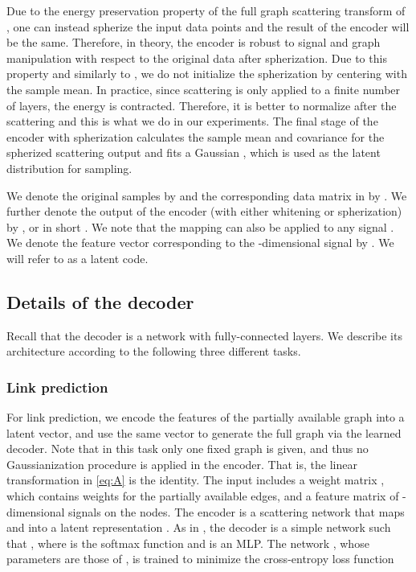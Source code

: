 \documentclass[conference]{IEEEtran}
\begin{document}
Due to the energy preservation property of the full graph scattering transform of \cite{zou2018graph}, one can instead spherize the input data points and the result of the encoder will be the same. Therefore, in theory, the encoder is robust to signal and graph manipulation with respect to the original data after spherization. Due to this property and similarly to \cite{bojanowski2018optimizing}, we do not initialize the spherization by centering with the sample mean. In practice, since scattering is only applied to a finite number of layers, the energy is contracted. Therefore, it is better {to} normalize after the scattering and this is what we do in our experiments. The final stage of the encoder with spherization calculates the sample mean  and covariance  for the spherized scattering output and fits a Gaussian , which is used as the latent distribution for sampling.

We denote the original samples by   and the corresponding data matrix in   by .
We further denote the output of the encoder (with either whitening or spherization) by , or in short . We note that the mapping  can also be applied to any signal . We denote the feature vector corresponding to the -dimensional signal  by . We will refer to  as a latent code. 



\subsection{Details of the decoder}
\label{sec:graph_scat_decode}
Recall that the decoder is a network with fully-connected layers. We describe its architecture according to the following three different tasks.  

\subsubsection{Link prediction}\label{subsec:theolinkpred}
For link prediction, we encode the features of the partially available graph into a latent vector, and use the same vector to generate the full graph via the learned decoder. Note that in this task only one fixed graph is given, and thus no Gaussianization procedure is applied in the encoder. That is, the linear transformation  in \eqref{eq:A} is the identity. The input includes a weight matrix , which contains weights for the partially available edges, and a feature matrix  of -dimensional signals on the  nodes. The encoder is a scattering network  that maps  and  into a latent representation . As in \cite{kipf2016variational}, the decoder is a simple network  such that , where  is the softmax function 
and  is an MLP. The network , whose parameters are those of , is trained to minimize the 
cross-entropy loss function 
\end{document}
